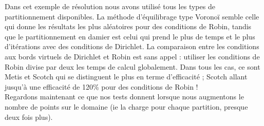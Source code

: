 \documentclass[a4paper,11pt]{article}
\begin{document}
\noindent Dans cet exemple de résolution nous avons utilisé tous les types de partitionnement disponibles. La méthode d'équilibrage type Voronoï semble celle qui donne les résultats les plus aléatoires pour des conditions de Robin, tandis que le partitionnement en damier est celui qui prend le plus de temps et le plus d'itérations avec des conditions de Dirichlet. La comparaison entre les conditions aux bords virtuels de Dirichlet et Robin est sans appel : utiliser les conditions de Robin divise par deux les temps de calcul globalement. Dans tous les cas, ce sont Metis et Scotch qui se distinguent le plus en terme d'efficacité ; Scotch allant jusqu'à une efficacité de 120\% pour des conditions de Robin !\\
Regardons maintenant ce que nos tests donnent lorsque nous augmentons le nombre de points sur le domaine (ie la charge pour chaque partition, presque deux fois plus).
\vspace*{-3mm}
\end{document}
